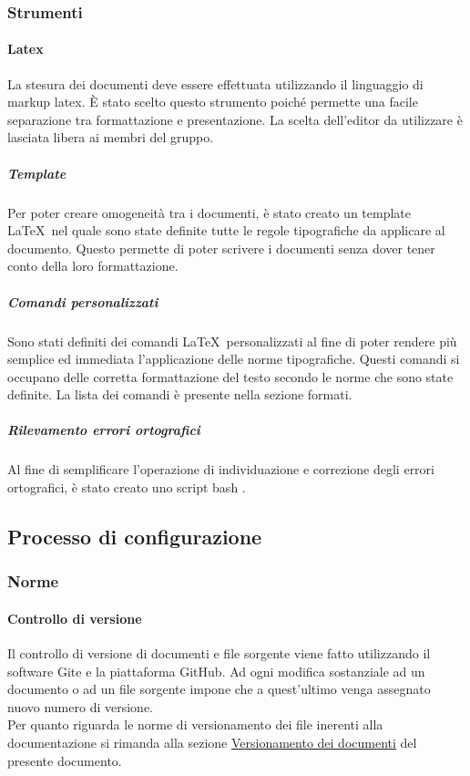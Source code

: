 \documentclass[../NormeProgetto.tex]{subfiles}
\begin{document}
	\subsubsection{Strumenti}
		\paragraph{Latex}
		La stesura dei documenti deve essere effettuata utilizzando il linguaggio di markup latex. È stato scelto questo strumento poiché permette una facile separazione tra formattazione e presentazione. La scelta dell'editor da utilizzare è lasciata libera ai membri del gruppo.
		
			\subparagraph{Template}
			Per poter creare omogeneità tra i documenti, è stato creato un template \LaTeX\ nel quale sono state definite tutte le regole tipografiche da applicare al documento. Questo permette di poter scrivere i documenti senza dover tener conto della loro formattazione.
			\subparagraph{Comandi personalizzati}
			Sono stati definiti dei comandi \LaTeX\ personalizzati al fine di poter rendere più semplice ed immediata l'applicazione delle norme tipografiche. Questi comandi si occupano delle corretta formattazione del testo secondo le norme che sono state definite. La lista dei comandi è presente nella sezione formati.
			\subparagraph{Rilevamento errori ortografici}
			Al fine di semplificare l'operazione di individuazione e correzione degli errori ortografici, è stato creato uno script bash .

\subsection{Processo di configurazione}
	\subsubsection{Norme}
	\paragraph{Controllo di versione}

	Il controllo di versione di documenti e file sorgente viene fatto utilizzando il software Gite e la piattaforma GitHub. Ad ogni modifica sostanziale ad un documento o ad un file sorgente impone che a quest'ultimo venga assegnato nuovo numero di versione. \\ Per quanto riguarda le norme di versionamento dei file inerenti alla documentazione si rimanda alla sezione \hyperref[sec:Versionamento dei documenti]{Versionamento dei documenti} del presente documento.
\end{document}
